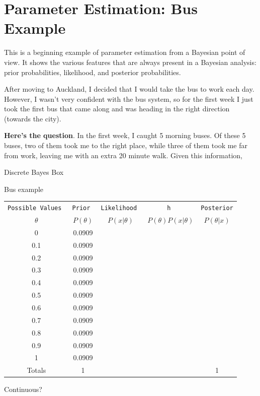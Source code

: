 \section{Parameter Estimation: Bus Example}
This is a beginning example of parameter estimation from a Bayesian point of
view. It shows the various features that are always present in a Bayesian
analysis: prior probabilities, likelihood, and posterior probabilities.

After moving to Auckland, I decided that I would take the bus to work
each day. However, I wasn't very confident with the bus system, so for the first
week I just took the first bus that came along and was heading in the right
direction (towards the city).

{\bf Here's the question}. In the first week, I caught 5 morning buses.
Of these 5 buses, two of them took me to the right place, while three of them
took me far from work, leaving me with an extra 20 minute walk. Given this
information, 




Discrete
Bayes Box

Bus example

\begin{table}
\begin{center}
\begin{tabular}{|c|c|c|c|c|}
\hline
\tt{Possible Values} & \tt{Prior} & \tt{Likelihood} & \tt{h} & \tt{Posterior}\\
$\theta$ & $P(\theta)$ & $P(x|\theta)$ & $P(\theta)P(x|\theta)$ & $P(\theta|x)$\\
\hline
0 & 0.0909 & & &\\
0.1 & 0.0909 & & &\\
0.2 & 0.0909 & & &\\
0.3 & 0.0909 & & &\\
0.4 & 0.0909 & & &\\
0.5 & 0.0909 & & &\\
0.6 & 0.0909 & & &\\
0.7 & 0.0909 & & &\\
0.8 & 0.0909 & & &\\
0.9 & 0.0909 & & &\\
1 & 0.0909 & & &\\
\hline
Totals & 1 & & & 1\\
\hline
\end{tabular}
\end{center}
\end{table}

Continuous?


